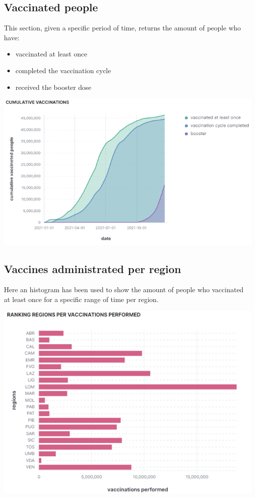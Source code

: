 \documentclass{article}
\begin{document}
\subsection{Vaccinated people}
This section, given a specific period of time, returns the amount of people who have:
\begin{itemize}
    \item vaccinated at least once
    \item completed the vaccination cycle
    \item received the booster dose
\end{itemize}

\begin{center}
\includegraphics[scale=0.6]{cumulat_vacc.png}
\end{center}

\subsection{Vaccines administrated per region}
Here an histogram has been used to show the amount of people who vaccinated at least once for a specific range of time per region.

\begin{center}
\includegraphics[scale=0.6]{ranking_regions.png}
\end{center}
\end{document}
